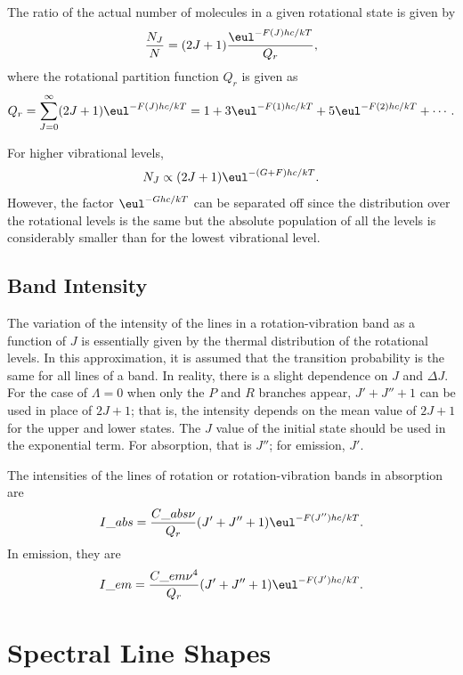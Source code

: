 \documentclass[11pt, twoside, fleqn]{report}
\begin{document}
The ratio of the actual number of molecules in a given rotational state is given by
\begin{equation*}
    \frac{N_J}{N} = (2J + 1)\frac{\eul^{-F(J)hc/kT}}{Q_r},
\end{equation*}
where the rotational partition function $Q_r$ is given as
\begin{equation}
    Q_r = \sum_{J=0}^{\infty}(2J + 1)\eul^{-F(J)hc/kT} = 1 + 3\eul^{-F(1)hc/kT} + 5\eul^{-F(2)hc/kT} + \dotsb.
\end{equation}

For higher vibrational levels,
\begin{equation}
    N_J \propto (2J + 1)\eul^{-(G + F)hc/kT}.
\end{equation}
However, the factor $\eul^{-Ghc/kT}$ can be separated off since the distribution over the rotational levels is the same but the absolute population of all the levels is considerably smaller than for the lowest vibrational level.

\section{Band Intensity}
\label{s:band_intensity}

The variation of the intensity of the lines in a rotation-vibration band as a function of $J$ is essentially given by the thermal distribution of the rotational levels. In this approximation, it is assumed that the transition probability is the same for all lines of a band. In reality, there is a slight dependence on $J$ and $\Delta{}J$. For the case of $\Lambda = 0$ when only the $P$ and $R$ branches appear, $J' + J'' + 1$ can be used in place of $2J + 1$; that is, the intensity depends on the mean value of $2J + 1$ for the upper and lower states. The $J$ value of the initial state should be used in the exponential term. For absorption, that is $J''$; for emission, $J'$.

The intensities of the lines of rotation or rotation-vibration bands in absorption are
\begin{equation}
    I\_{abs} = \frac{C\_{abs}\nu}{Q_r}(J' + J'' + 1)\eul^{-F(J'')hc/kT}.
\end{equation}
In emission, they are
\begin{equation}
    I\_{em} = \frac{C\_{em}\nu^4}{Q_r}(J' + J'' + 1)\eul^{-F(J')hc/kT}.
\end{equation}

\chapter{Spectral Line Shapes}
\label{c:spectral_line_shapes}
\end{document}
